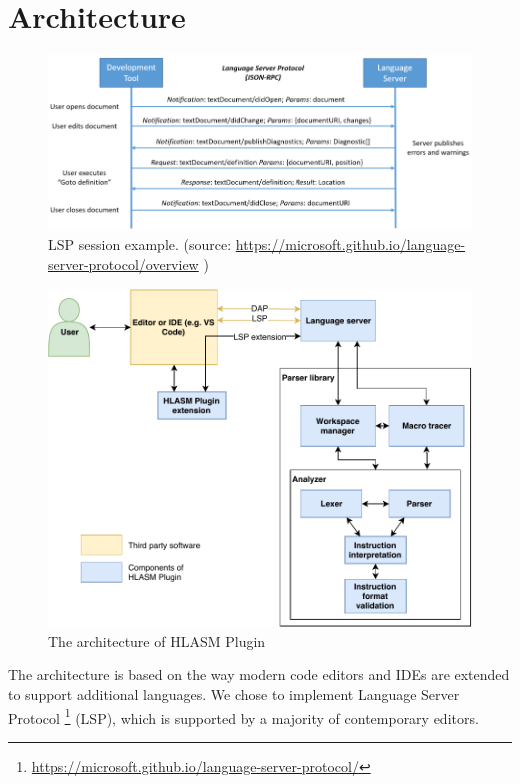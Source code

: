 \chapter{Architecture}

\begin{figure}
	\centering
	\includegraphics[width=\textwidth]{img/language-server-sequence}
	\caption[LSP session example.]{LSP session example. (source: \url{https://microsoft.github.io/language-server-protocol/overview} )}
	\label{fig04:LSP}
\end{figure}

\begin{figure}
	\centering
	\includegraphics[width=\textwidth]{img/hlasm_architecture}
	\caption{The architecture of HLASM Plugin}
	\label{fig04:arch}
\end{figure}

The architecture is based on the way modern code editors and IDEs are extended to support additional languages. We chose to implement Language Server Protocol \footnote{\url{https://microsoft.github.io/language-server-protocol/}} (LSP), which is supported by a majority of contemporary editors.


